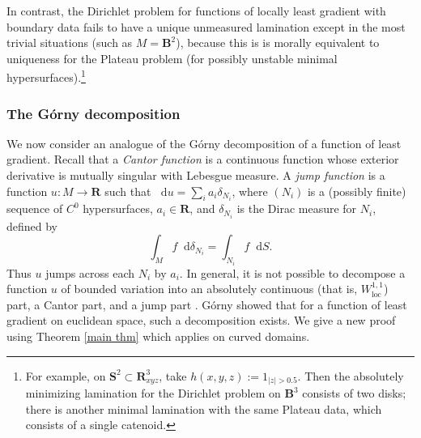 \documentclass[reqno,11pt]{amsart}
\newcommand{\RR}{\mathbf{R}}
\newcommand{\Sph}{\mathbf S}
\newcommand{\Ball}{\mathbf{B}}
\newcommand*\dif{\mathop{}\!\mathrm{d}}
\newcommand{\dfn}[1]{\emph{#1}\index{#1}}
\newcommand{\loc}{\mathrm{loc}}
\theoremstyle{definition}
\numberwithin{equation}{section}
\begin{document}
In contrast, the Dirichlet problem for functions of locally least gradient with boundary data fails to have a unique unmeasured lamination except in the most trivial situations (such as $M = \Ball^2$), because this is is morally equivalent to uniqueness for the Plateau problem (for possibly unstable minimal hypersurfaces).\footnote{For example, on $\Sph^2 \subset \RR^3_{xyz}$, take $h(x, y, z) := 1_{|z| > 0.5}$. Then the absolutely minimizing lamination for the Dirichlet problem on $\Ball^3$ consists of two disks; there is another minimal lamination with the same Plateau data, which consists of a single catenoid.}

\subsubsection{The G\'orny decomposition}
We now consider an analogue of the G\'orny decomposition \cite[Theorem 1.2]{górny2017planar} of a function of least gradient.
Recall that a \dfn{Cantor function} is a continuous function whose exterior derivative is mutually singular with Lebesgue measure.
A \dfn{jump function} is a function $u: M \to \RR$ such that $\dif u = \sum_i a_i \delta_{N_i}$, where $(N_i)$ is a (possibly finite) sequence of $C^0$ hypersurfaces, $a_i \in \RR$, and $\delta_{N_i}$ is the Dirac measure for $N_i$, defined by
$$\int_M f \dif \delta_{N_i} = \int_{N_i} f \dif S.$$
Thus $u$ jumps across each $N_i$ by $a_i$.
In general, it is not possible to decompose a function $u$ of bounded variation into an absolutely continuous (that is, $W^{1, 1}_\loc$) part, a Cantor part, and a jump part \cite[Example 4.1]{Ambrosio2000FunctionsOB}.
G\'orny showed that for a function of least gradient on euclidean space, such a decomposition exists.
We give a new proof using Theorem \ref{main thm} which applies on curved domains.
\end{document}
